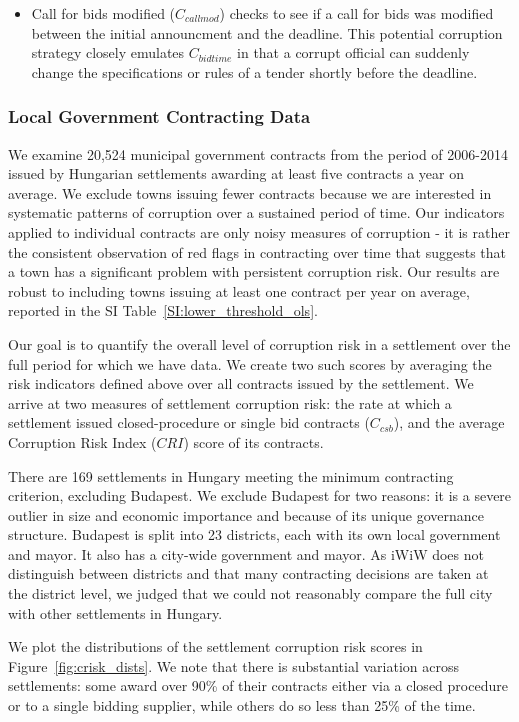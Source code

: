 \begin{itemize}
\item Call for bids modified ($C_{callmod}$) checks to see if a call for bids was modified between the initial announcment and the deadline. This potential corruption strategy closely emulates $C_{bidtime}$ in that a corrupt official can suddenly change the specifications or rules of a tender shortly before the deadline.
\end{itemize}


\subsubsection{Local Government Contracting Data}
We examine 20,524 municipal government contracts from the period of 2006-2014 issued by Hungarian settlements awarding at least five contracts a year on average. We exclude towns issuing fewer contracts because we are interested in systematic patterns of corruption over a sustained period of time. Our indicators applied to individual contracts are only noisy measures of corruption - it is rather the consistent observation of red flags in contracting over time that suggests that a town has a significant problem with persistent corruption risk. Our results are robust to including towns issuing at least one contract per year on average, reported in the SI Table~\ref{SI:lower_threshold_ols}.

Our goal is to quantify the overall level of corruption risk in a settlement over the full period for which we have data. We create two such scores by averaging the risk indicators defined above over all contracts issued by the settlement. We arrive at two measures of settlement corruption risk: the rate at which a settlement issued closed-procedure or single bid contracts ($C_{csb}$), and the average Corruption Risk Index ($CRI$) score of its contracts.

There are 169 settlements in Hungary meeting the minimum contracting criterion, excluding Budapest. We exclude Budapest for two reasons: it is a severe outlier in size and economic importance and because of its unique governance structure. Budapest is split into 23 districts, each with its own local government and mayor. It also has a city-wide government and mayor. As iWiW does not distinguish between districts and that many contracting decisions are taken at the district level, we judged that we could not reasonably compare the full city with other settlements in Hungary. 

We plot the distributions of the settlement corruption risk scores in Figure~\ref{fig:crisk_dists}. We note that there is substantial variation across settlements: some award over 90\% of their contracts either via a closed procedure or to a single bidding supplier, while others do so less than 25\% of the time.

